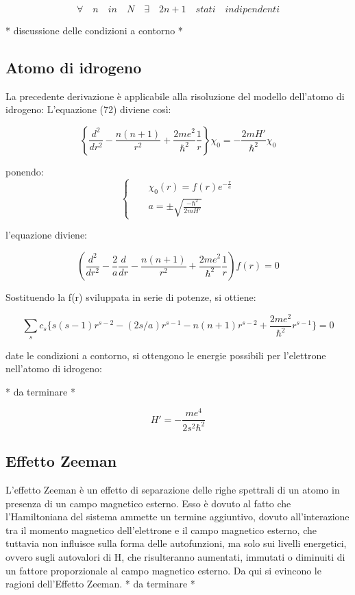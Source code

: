\documentclass{article}
\begin{document}
\begin{equation}
    \forall \quad n \quad in \quad N \quad \exists \quad 2n+1 \quad stati \quad indipendenti
\end{equation}


* discussione delle condizioni a contorno *

\subsection{Atomo di idrogeno}
La precedente derivazione è applicabile alla risoluzione del modello dell'atomo di idrogeno:
L'equazione (72) diviene così:

\begin{equation}
    \left\{\frac{d^2}{dr^2} -\frac{n(n+1)}{r^2} +\frac{2me^2}{\hbar^2}\frac{1}{r} \right\}\chi_0= -\frac{2mH'}{\hbar^2}\chi_0
\end{equation}

ponendo:
\begin{equation}
    \left\{
    \begin{aligned}
         &  & \chi_0(r)=f(r)e^{-\frac{r}{a}}     \\
         &  & a=\pm \sqrt{\frac{-\hbar^2}{2mH'}}
    \end{aligned}
    \right.
\end{equation}

l'equazione diviene:

\begin{equation}
    \left(\frac{d^2}{dr^2} -\frac{2}{a}\frac{d}{dr} -\frac{n(n+1)}{r^2} +\frac{2me^2}{\hbar^2}\frac{1}{r}\right)f(r)=0
\end{equation}

Sostituendo la f(r) sviluppata in serie di potenze, si ottiene:

\begin{equation}
    \sum_{s} c_s \{s(s-1)r^{s-2}-(2s/a)r^{s-1}-n(n+1)r^{s-2}+\frac{2me^2}{\hbar^2}r^{s-1} \}=0
\end{equation}

date le condizioni a contorno, si ottengono le energie possibili per l'elettrone nell'atomo di idrogeno:

* da terminare *

\begin{equation}
    H'=-\frac{me^4}{2s^2\hbar^2}
\end{equation}

\subsection{Effetto Zeeman}
L'effetto Zeeman è un effetto di separazione delle righe spettrali di un atomo in presenza di un campo magnetico esterno.
Esso è dovuto al fatto che l'Hamiltoniana del sistema ammette un termine aggiuntivo, dovuto all'interazione tra il momento magnetico dell'elettrone e il campo magnetico esterno,
che tuttavia non influisce sulla forma delle autofunzioni, ma solo sui livelli energetici, ovvero sugli autovalori di H,
che risulteranno aumentati, immutati o diminuiti di un fattore proporzionale al campo magnetico esterno.
Da qui si evincono le ragioni dell'Effetto Zeeman.
* da terminare *
\end{document}
